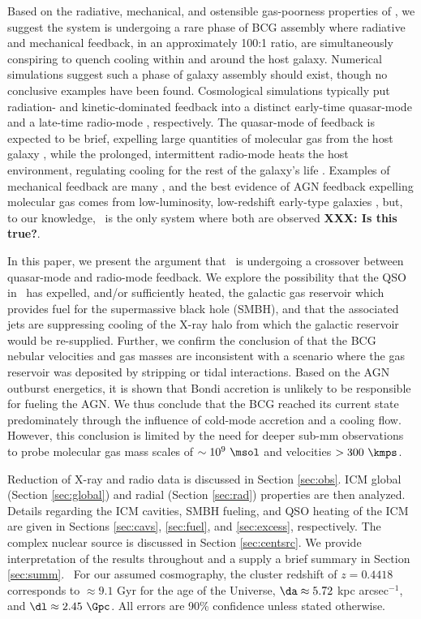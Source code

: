 \documentclass[useAMS,usenatbib]{mn2e}
\begin{document}
Based on the radiative, mechanical, and ostensible gas-poorness
properties of \irs, we suggest the system is undergoing a rare phase
of BCG assembly where radiative and mechanical feedback, in an
approximately 100:1 ratio, are simultaneously conspiring to quench
cooling within and around the host galaxy. Numerical simulations
suggest such a phase of galaxy assembly should exist, though no
conclusive examples have been found. Cosmological simulations
typically put radiation- and kinetic-dominated feedback into a
distinct early-time quasar-mode \citep[\eg][]{2005Natur.435..629S} and
a late-time radio-mode \citep[\eg][]{croton06, bower08},
respectively. The quasar-mode of feedback is expected to be brief,
expelling large quantities of molecular gas from the host galaxy
\citep{2006ApJ...642L.107N}, while the prolonged, intermittent
radio-mode heats the host environment, regulating cooling for the rest
of the galaxy's life \citep[see][for a review]{mcnamrev}. Examples of
mechanical feedback are many \citep[\eg][]{perseus1, ms0735}, and the
best evidence of AGN feedback expelling molecular gas comes from
low-luminosity, low-redshift early-type galaxies
\citep[\eg][]{2009ApJ...690.1672S}, but, to our knowledge, \irs\ is
the only system where both are observed {\bf{XXX: Is this true?}}.

In this paper, we present the argument that \irs\ is undergoing a
crossover between quasar-mode and radio-mode feedback. We explore the
possibility that the QSO in \irs\ has expelled, and/or sufficiently
heated, the galactic gas reservoir which provides fuel for the
supermassive black hole (SMBH), and that the associated jets are
suppressing cooling of the X-ray halo from which the galactic
reservoir would be re-supplied. Further, we confirm the conclusion of
\citet{1996MNRAS.283.1003C} that the BCG nebular velocities and gas
masses are inconsistent with a scenario where the gas reservoir was
deposited by stripping or tidal interactions. Based on the AGN
outburst energetics, it is shown that Bondi accretion is unlikely to
be responsible for fueling the AGN. We thus conclude that the BCG
reached its current state predominately through the influence of
cold-mode accretion and a cooling flow. However, this conclusion is
limited by the need for deeper sub-mm observations to probe molecular
gas mass scales of $\sim 10^9 ~\msol$ and velocities $> 300 ~\kmps$.

Reduction of X-ray and radio data is discussed in Section
\ref{sec:obs}. ICM global (Section \ref{sec:global}) and radial
(Section \ref{sec:rad}) properties are then analyzed. Details
regarding the ICM cavities, SMBH fueling, and QSO heating of the ICM
are given in Sections \ref{sec:cavs}, \ref{sec:fuel}, and
\ref{sec:excess}, respectively. The complex nuclear source is
discussed in Section \ref{sec:centsrc}. We provide interpretation of
the results throughout and a supply a brief summary in Section
\ref{sec:summ}. \LCDM\ For our assumed cosmography, the cluster
redshift of $z = 0.4418$ corresponds to $\approx 9.1$ Gyr for the age
of the Universe, $\da \approx 5.72$ kpc arcsec$^{-1}$, and $\dl
\approx 2.45~\Gpc$. All errors are 90\% confidence unless stated
otherwise.
\end{document}
